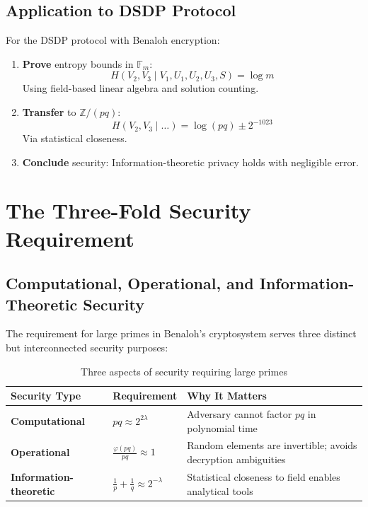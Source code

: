 \documentclass[11pt]{article}
\theoremstyle{definition}
\begin{document}
\subsection{Application to DSDP Protocol}

For the DSDP protocol with Benaloh encryption:

\begin{enumerate}
\item \textbf{Prove} entropy bounds in $\mathbb{F}_m$:
  \[
  H(V_2, V_3 \mid V_1, U_1, U_2, U_3, S) = \log m
  \]
  Using field-based linear algebra and solution counting.

\item \textbf{Transfer} to $\mathbb{Z}/(pq)$:
  \[
  H(V_2, V_3 \mid \ldots) = \log(pq) \pm 2^{-1023}
  \]
  Via statistical closeness.

\item \textbf{Conclude} security:
  Information-theoretic privacy holds with negligible error.
\end{enumerate}

\section{The Three-Fold Security Requirement}

\subsection{Computational, Operational, and Information-Theoretic Security}

The requirement for large primes in Benaloh's cryptosystem serves three distinct but interconnected security purposes:

\begin{table}[h]
\centering
\begin{tabular}{@{}p{}p{}p{}@{}}
\toprule
\textbf{Security Type} & \textbf{Requirement} & \textbf{Why It Matters} \\ 
\midrule
\textbf{Computational} & $pq \approx 2^{2\lambda}$ & Adversary cannot factor $pq$ in polynomial time \\[0.5em]
\textbf{Operational} & $\frac{\varphi(pq)}{pq} \approx 1$ & Random elements are invertible; avoids decryption ambiguities \\[0.5em]
\textbf{Information-theoretic} & $\frac{1}{p} + \frac{1}{q} \approx 2^{-\lambda}$ & Statistical closeness to field enables analytical tools \\
\bottomrule
\end{tabular}
\caption{Three aspects of security requiring large primes}
\end{table}
\end{document}
